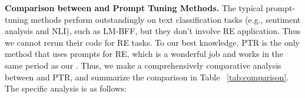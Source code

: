 \documentclass[sigconf]{acmart}
\begin{document}
\begin{table}[htbp]
    \begin{center}
    \small
    \caption{Ablation study  on SemEval, VAW and VTW refers to virtual answer words and type words.
    }
    \label{tab:pair_ablation}
    \end{center}
\end{table}

\textbf{Comparison between {\ours} and Prompt Tuning Methods.}
The typical prompt-tuning methods perform outstandingly on text classification tasks (e.g., sentiment analysis and NLI), such as LM-BFF, but they don't involve RE application. Thus we cannot rerun their code for RE tasks.
To our best knowledge, PTR is the only method that uses prompts for RE, which is a wonderful job and works in the same period as our \ours. 
Thus, we make a comprehensively comparative analysis between {\ours} and PTR, and summarize the comparison in Table ~\ref{tab:comparison}. The specific analysis is as follows:
\end{document}
